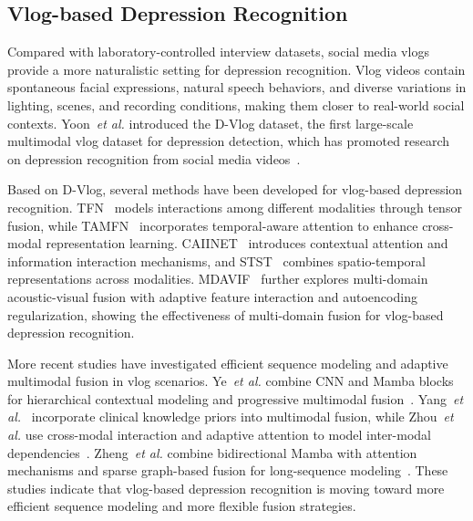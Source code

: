 \documentclass[a4paper,fleqn]{cas-dc}
\begin{document}
\subsection{Vlog-based Depression Recognition}
Compared with laboratory-controlled interview datasets, social media vlogs provide a more naturalistic setting for depression recognition. Vlog videos contain spontaneous facial expressions, natural speech behaviors, and diverse variations in lighting, scenes, and recording conditions, making them closer to real-world social contexts. Yoon~\textit{et al.} introduced the D-Vlog dataset, the first large-scale multimodal vlog dataset for depression detection, which has promoted research on depression recognition from social media videos~\cite{dataset:dvlog}.

Based on D-Vlog, several methods have been developed for vlog-based depression recognition. TFN~\cite{model:TFN} models interactions among different modalities through tensor fusion, while TAMFN~\cite{model:TAMFN} incorporates temporal-aware attention to enhance cross-modal representation learning. CAIINET~\cite{model:CAIINET} introduces contextual attention and information interaction mechanisms, and STST~\cite{model:STST} combines spatio-temporal representations across modalities. MDAVIF~\cite{model:MDAVIF} further explores multi-domain acoustic-visual fusion with adaptive feature interaction and autoencoding regularization, showing the effectiveness of multi-domain fusion for vlog-based depression recognition.

More recent studies have investigated efficient sequence modeling and adaptive multimodal fusion in vlog scenarios. Ye~\textit{et al.} combine CNN and Mamba blocks for hierarchical contextual modeling and progressive multimodal fusion~\cite{model:DepMamba}. 
Yang~\textit{et al.}~\cite{model:DepMPK}
incorporate clinical knowledge priors into multimodal fusion, while Zhou~\textit{et al.} use cross-modal interaction and adaptive attention to model inter-modal dependencies~\cite{model:CAFMamba}. Zheng~\textit{et al.} combine bidirectional Mamba with attention mechanisms and sparse graph-based fusion for long-sequence modeling~\cite{model:AttMamba}. These studies indicate that vlog-based depression recognition is moving toward more efficient sequence modeling and more flexible fusion strategies.
\end{document}
